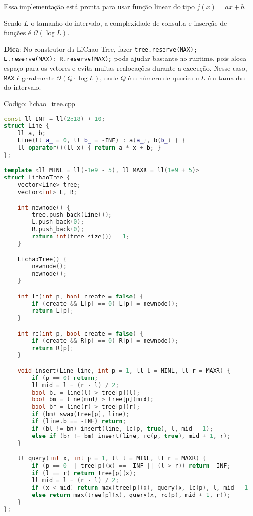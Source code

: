 \documentclass[10pt, a4paper, oneside]{book}
\begin{document}
Essa implementação está pronta para usar função linear do tipo $f(x) = ax + b$.



Sendo $L$ o tamanho do intervalo, a complexidade de consulta e inserção de funções é $\mathcal{O}(\log L)$.



\textbf{Dica}: No construtor da LiChao Tree, fazer \texttt{tree.reserve(MAX); L.reserve(MAX); R.reserve(MAX);} pode ajudar bastante no runtime, pois aloca espaço para os vetores e evita muitas realocações durante a execução. Nesse caso, \texttt{MAX} é geralmente $\mathcal{O}(Q \cdot \log L)$, onde $Q$ é o número de queries e $L$ é o tamanho do intervalo.
\hfill

Codigo: lichao\_tree.cpp

\begin{lstlisting}[language=C++]
const ll INF = ll(2e18) + 10;
struct Line {
    ll a, b;
    Line(ll a_ = 0, ll b_ = -INF) : a(a_), b(b_) { }
    ll operator()(ll x) { return a * x + b; }
};

template <ll MINL = ll(-1e9 - 5), ll MAXR = ll(1e9 + 5)>
struct LichaoTree {
    vector<Line> tree;
    vector<int> L, R;

    int newnode() {
        tree.push_back(Line());
        L.push_back(0);
        R.push_back(0);
        return int(tree.size()) - 1;
    }

    LichaoTree() {
        newnode();
        newnode();
    }

    int lc(int p, bool create = false) {
        if (create && L[p] == 0) L[p] = newnode();
        return L[p];
    }

    int rc(int p, bool create = false) {
        if (create && R[p] == 0) R[p] = newnode();
        return R[p];
    }

    void insert(Line line, int p = 1, ll l = MINL, ll r = MAXR) {
        if (p == 0) return;
        ll mid = l + (r - l) / 2;
        bool bl = line(l) > tree[p](l);
        bool bm = line(mid) > tree[p](mid);
        bool br = line(r) > tree[p](r);
        if (bm) swap(tree[p], line);
        if (line.b == -INF) return;
        if (bl != bm) insert(line, lc(p, true), l, mid - 1);
        else if (br != bm) insert(line, rc(p, true), mid + 1, r);
    }

    ll query(int x, int p = 1, ll l = MINL, ll r = MAXR) {
        if (p == 0 || tree[p](x) == -INF || (l > r)) return -INF;
        if (l == r) return tree[p](x);
        ll mid = l + (r - l) / 2;
        if (x < mid) return max(tree[p](x), query(x, lc(p), l, mid - 1));
        else return max(tree[p](x), query(x, rc(p), mid + 1, r));
    }
};
\end{lstlisting}
\hfill
\end{document}

